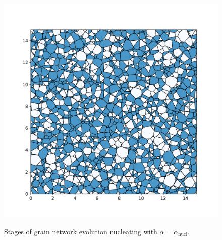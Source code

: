\begin{figure}[ht]
{    \includegraphics[scale=0.40, trim={2em 0 2em 0}]{figures/stored_energy/SEnucl2/snaps/000110.pdf}
    \label{fig:SEnucl2_dist_2}
    }%
    \caption{Stages of grain network evolution nucleating with $\alpha = \alpha_{\text{nucl}}$.}
    \label{fig:SEnucl2_evolution}
\end{figure}

